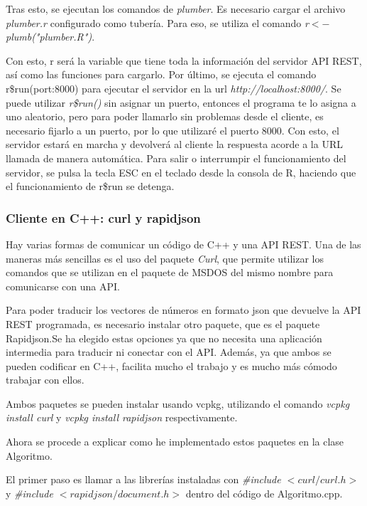 Tras esto, se ejecutan los comandos de  \textit{plumber}. Es necesario cargar el archivo \textit{plumber.r} configurado como tubería. Para eso, se utiliza el comando \textit{r$<-$ plumb("plumber.R")}.

Con esto, r será la variable que tiene toda la información del servidor API REST, así como las funciones para cargarlo.
Por último, se ejecuta el comando r\$run(port:8000) para ejecutar el servidor en la url  \textit{http://localhost:8000/}. Se puede utilizar  \textit{r\$run()} sin asignar un puerto, entonces el programa te lo asigna a uno aleatorio, pero para poder llamarlo sin problemas desde el cliente, es necesario fijarlo a un puerto, por lo que utilizaré el puerto 8000.
Con esto, el servidor estará en marcha y devolverá al cliente la respuesta acorde a la URL llamada de manera automática. 
Para salir o interrumpir el funcionamiento del servidor, se pulsa la tecla ESC en el teclado desde la consola de R, haciendo que el funcionamiento de r\$run se detenga.

\subsubsection{Cliente en C++: curl y rapidjson}

Hay varias formas de comunicar un código de C++ y una API REST. Una de las maneras más sencillas es el uso del paquete  \textit{Curl}\cite{curl}, que permite utilizar los comandos que se utilizan en el paquete de MSDOS del mismo nombre para comunicarse con una API. 

Para poder traducir los vectores de números en formato json que devuelve la API REST programada, es necesario instalar otro paquete, que es el paquete Rapidjson\cite{rapidjson}.Se ha elegido estas opciones ya que no necesita una aplicación intermedia para traducir ni conectar con el API. Además, ya que ambos se pueden codificar en C++, facilita mucho el trabajo y es mucho más cómodo trabajar con ellos.

Ambos paquetes se pueden instalar usando vcpkg\cite{vpk}, utilizando el comando  \textit{vcpkg install curl} y  \textit{vcpkg install rapidjson} respectivamente.

Ahora se procede a explicar como he implementado estos paquetes en la clase Algoritmo.

El primer paso es llamar a las librerías instaladas con \textit{\#include $<curl/curl.h>$}y \textit{\#include $<rapidjson/document.h>$} dentro del código de Algoritmo.cpp.

